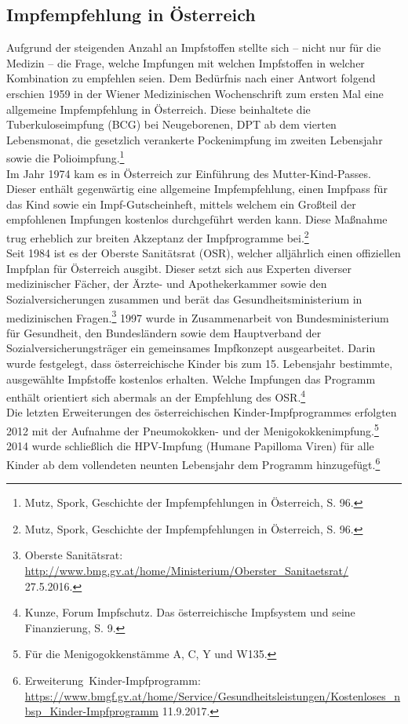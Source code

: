 \documentclass[
    a4paper,
    12pt,
    hyphens,
    chapterprefix=true,
    headheight=33pt,
    footheight=29pt,
    headings=optiontohead, %
]{scrartcl}
\begin{document}
\subsection{Impfempfehlung in Österreich}
Aufgrund der steigenden Anzahl an Impfstoffen stellte sich -- nicht nur für die Medizin -- die Frage, welche Impfungen mit welchen 
Impfstoffen in welcher Kombination zu empfehlen seien. Dem Bedürfnis nach einer Antwort folgend erschien 1959 in der Wiener Medizinischen Wochenschrift 
zum ersten Mal eine allgemeine Impfempfehlung in Österreich. Diese beinhaltete die Tuberkuloseimpfung (BCG) bei Neugeborenen, DPT ab 
dem vierten Lebensmonat, die gesetzlich verankerte Pockenimpfung im zweiten Lebensjahr sowie die Polioimpfung.\footnote{Mutz, Spork, 
Geschichte der Impfempfehlungen in Österreich, S. 96.}\\
Im Jahr 1974 kam es in Österreich zur Einführung des Mutter-Kind-Passes. Dieser enthält gegenwärtig 
eine allgemeine Impfempfehlung, einen Impfpass für das Kind sowie ein Impf-Gutscheinheft, mittels welchem ein Großteil der empfohlenen 
Impfungen kostenlos durchgeführt werden kann. Diese Maßnahme trug erheblich zur breiten Akzeptanz der Impfprogramme bei.\footnote{Mutz, Spork, Geschichte der Impfempfehlungen in Österreich, S. 96.} \\
Seit 1984 ist es der Oberste Sanitätsrat (OSR), welcher alljährlich einen offiziellen Impfplan für Österreich ausgibt. Dieser setzt sich aus Experten diverser medizinischer Fächer, der Ärzte- und Apothekerkammer sowie den Sozialversicherungen 
zusammen und berät das Gesundheitsministerium in medizinischen Fragen.\footnote{Oberste Sanitätsrat: \url{http://www.bmg.gv.at/home/Ministerium/Oberster_Sanitaetsrat/} 27.5.2016.}
1997 wurde in Zusammenarbeit von Bundesministerium für Gesundheit, den Bundesländern sowie dem Hauptverband der Sozialversicherungsträger  
ein gemeinsames Impfkonzept ausgearbeitet. Darin wurde festgelegt, dass österreichische Kinder bis zum 15. Lebensjahr bestimmte, 
ausgewählte Impfstoffe kostenlos erhalten. Welche Impfungen das Programm enthält orientiert sich abermals an der Empfehlung des 
OSR.\footnote{Kunze, Forum Impfschutz. Das österreichische Impfsystem und seine Finanzierung, S. 9.}\\
Die letzten Erweiterungen des österreichischen Kinder-Impfprogrammes erfolgten 2012 mit der Aufnahme der Pneumokokken- und der 
Menigokokkenimpfung.\footnote{Für die Menigogokkenstämme A, C, Y und W135.} 2014 wurde schließlich die HPV-Impfung
(Humane Papilloma Viren) für alle Kinder ab dem vollendeten neunten Lebensjahr dem Programm hinzugefügt.\footnote{Erweiterung~Kinder-Impfprogramm:\\\url{https://www.bmgf.gv.at/home/Service/Gesundheitsleistungen/Kostenloses_nbsp_Kinder-Impfprogramm} 11.9.2017.}
\end{document}
